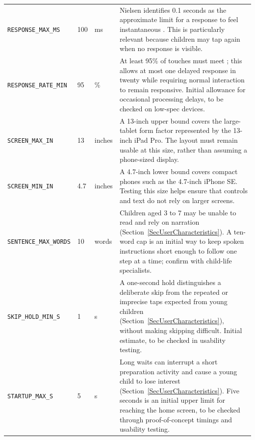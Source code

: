 \documentclass[10pt]{article}
\newcommand{\constref}[1]{%
    \hyperref[const:#1]{\texttt{\detokenize{#1}}}%
}
\begin{document}
\begin{longtable}{>{\raggedright\arraybackslash}p{} p{} >{\raggedright\arraybackslash}p{} >{\raggedright\arraybackslash}p{}}
\texttt{RESPONSE\_MAX\_MS}
\label{const:RESPONSE_MAX_MS}
& 100 & ms & Nielsen identifies 0.1 seconds as the approximate limit for a response to feel instantaneous \cite{Nielsen1993}. This is particularly relevant because children may tap again when no response is visible. \\

\texttt{RESPONSE\_RATE\_MIN}
\label{const:RESPONSE_RATE_MIN}
& 95 & \% & At least 95\% of touches must meet \constref{RESPONSE_MAX_MS}; this allows at most one delayed response in twenty while requiring normal interaction to remain responsive. Initial allowance for occasional processing delays, to be checked on low-spec devices. \\

\texttt{SCREEN\_MAX\_IN}
\label{const:SCREEN_MAX_IN}
& 13 & inches & A 13-inch upper bound covers the large-tablet form factor represented by the 13-inch iPad Pro. The layout must remain usable at this size, rather than assuming a phone-sized display. \\

\texttt{SCREEN\_MIN\_IN}
\label{const:SCREEN_MIN_IN}
& 4.7 & inches & A 4.7-inch lower bound covers compact phones such as the 4.7-inch iPhone SE. Testing this size helps ensure that controls and text do not rely on larger screens. \\

\texttt{SENTENCE\_MAX\_WORDS}
\label{const:SENTENCE_MAX_WORDS}
& 10 & words & Children aged 3 to 7 may be unable to read and rely on narration (Section~\ref{SecUserCharacteristics}). A ten-word cap is an initial way to keep spoken instructions short enough to follow one step at a time; confirm with child-life specialists. \\

\texttt{SKIP\_HOLD\_MIN\_S}
\label{const:SKIP_HOLD_MIN_S}
& 1 & s & A one-second hold distinguishes a deliberate skip from the repeated or imprecise taps expected from young children (Section~\ref{SecUserCharacteristics}), without making skipping difficult. Initial estimate, to be checked in usability testing. \\

\texttt{STARTUP\_MAX\_S}
\label{const:STARTUP_MAX_S}
& 5 & s & Long waits can interrupt a short preparation activity and cause a young child to lose interest (Section~\ref{SecUserCharacteristics}). Five seconds is an initial upper limit for reaching the home screen, to be checked through proof-of-concept timings and usability testing. \\


\end{longtable}
\end{document}
